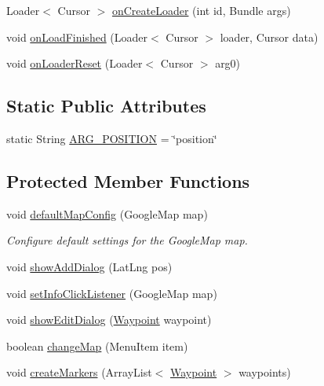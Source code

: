 \begin{DoxyCompactItemize}
\item 
Loader$<$ Cursor $>$ \hyperlink{classuk_1_1ac_1_1swan_1_1digitaltrails_1_1fragments_1_1_map_fragment_a965207c6caeed51ea42d2cd5601ac7a9}{on\+Create\+Loader} (int id, Bundle args)
\item 
void \hyperlink{classuk_1_1ac_1_1swan_1_1digitaltrails_1_1fragments_1_1_map_fragment_a0d68affd08464bcc7b08af1b2205a612}{on\+Load\+Finished} (Loader$<$ Cursor $>$ loader, Cursor data)
\item 
void \hyperlink{classuk_1_1ac_1_1swan_1_1digitaltrails_1_1fragments_1_1_map_fragment_aa1c7a413fcfbcd95b6acb9ded41fcb53}{on\+Loader\+Reset} (Loader$<$ Cursor $>$ arg0)
\end{DoxyCompactItemize}
\subsection*{Static Public Attributes}
\begin{DoxyCompactItemize}
\item 
static String \hyperlink{classuk_1_1ac_1_1swan_1_1digitaltrails_1_1fragments_1_1_map_fragment_afb16e94fea40dd9c0716e5b1f4c30dc8}{A\+R\+G\+\_\+\+P\+O\+S\+I\+T\+I\+O\+N} = \char`\"{}position\char`\"{}
\end{DoxyCompactItemize}
\subsection*{Protected Member Functions}
\begin{DoxyCompactItemize}
\item 
void \hyperlink{classuk_1_1ac_1_1swan_1_1digitaltrails_1_1fragments_1_1_map_fragment_ad7ad0119b7dd10580e3053fdf21b64f2}{default\+Map\+Config} (Google\+Map map)
\begin{DoxyCompactList}\small\item\em Configure default settings for the Google\+Map map. \end{DoxyCompactList}\item 
void \hyperlink{classuk_1_1ac_1_1swan_1_1digitaltrails_1_1fragments_1_1_map_fragment_af458f2c1b3e5c9cc817ac1403e04de41}{show\+Add\+Dialog} (Lat\+Lng pos)
\item 
void \hyperlink{classuk_1_1ac_1_1swan_1_1digitaltrails_1_1fragments_1_1_map_fragment_a48c1510176cd4f173b5750d9dec68f52}{set\+Info\+Click\+Listener} (Google\+Map map)
\item 
void \hyperlink{classuk_1_1ac_1_1swan_1_1digitaltrails_1_1fragments_1_1_map_fragment_a0761db3d0d32cbd7287471e909fb5a80}{show\+Edit\+Dialog} (\hyperlink{classuk_1_1ac_1_1swan_1_1digitaltrails_1_1components_1_1_waypoint}{Waypoint} waypoint)
\item 
boolean \hyperlink{classuk_1_1ac_1_1swan_1_1digitaltrails_1_1fragments_1_1_map_fragment_a0be39a91507123ee918a60e992b27951}{change\+Map} (Menu\+Item item)
\item 
void \hyperlink{classuk_1_1ac_1_1swan_1_1digitaltrails_1_1fragments_1_1_map_fragment_a496a4efd2fbbf4e941a02f74b932b23c}{create\+Markers} (Array\+List$<$ \hyperlink{classuk_1_1ac_1_1swan_1_1digitaltrails_1_1components_1_1_waypoint}{Waypoint} $>$ waypoints)
\end{DoxyCompactItemize}
